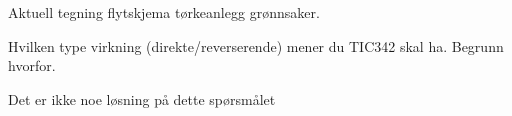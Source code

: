 

Aktuell tegning flytskjema t{\o}rkeanlegg gr{\o}nnsaker. 

Hvilken type virkning (direkte/reverserende) mener du TIC342 skal ha. Begrunn hvorfor. 







Det er ikke noe l{\o}sning p{\aa} dette sp{\o}rsm{\aa}let













